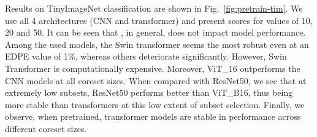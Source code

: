 Results on TinyImageNet classification are shown in \mbox{Fig. \ref{fig:pretrain-tim}}. We use all 4 architectures (CNN and transformer) and present scores for  values of 10, 20 and 50. It can be seen that , in general, does not impact model performance. Among the used models, the Swin transformer seems the most robust even at an EDPE value of 1\%, whereas others deteriorate significantly. However, Swin Transformer is computationally expensive. Moreover, ViT\_16 outperforms the CNN models at all coreset sizes. When compared with ResNet50, we see that at extremely low subsets, ResNet50 performs better than ViT\_B16, thus being more stable than transformers at this low extent of subset selection. Finally, we observe, when pretrained, transformer models are stable in performance across different coreset sizes.






